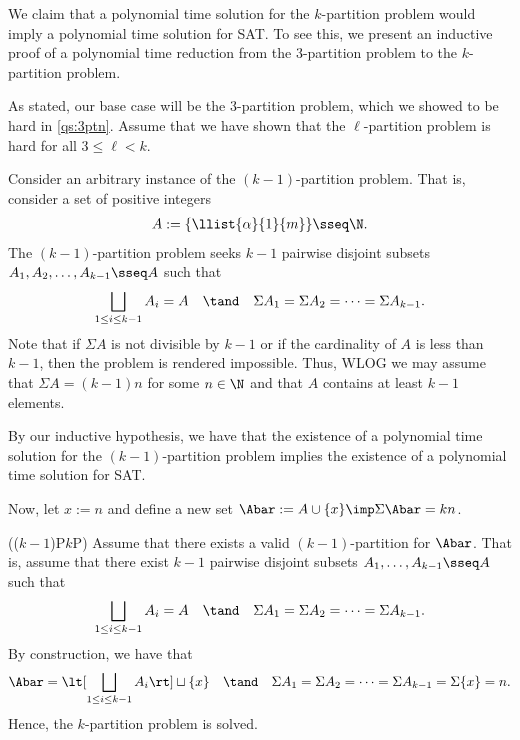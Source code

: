 \documentclass{article}
\begin{document}
\begin{solution}
  We claim that a polynomial time solution for the $ k $-partition problem would imply a polynomial time solution for SAT.
  To see this, we present an inductive proof of a polynomial time reduction from the 3-partition problem to the $ k $-partition problem.

  As stated, our base case will be the 3-partition problem, which we showed to be hard in \ref{qs:3ptn}.
  Assume that we have shown that the $ \ell $-partition problem is hard for all $ 3\leq\ell < k $.

  Consider an arbitrary instance of the $ (k-1) $-partition problem.
  That is, consider a set of positive integers \begin{align*}
    A := \{\llist{\alpha}{1}{m}\} \sseq \N.
  \end{align*}
  The $ (k-1) $-partition problem seeks $ k-1 $ pairwise disjoint subsets $ A_1,A_2,\ldots,A_{k-1}\sseq A $ such that \begin{align*}
    \bigsqcup_{1\leq i \leq k-1}A_{i} = A \quad \tand \quad \Sigma A_1 = \Sigma A_2 = \cdots = \Sigma A_{k-1}.
  \end{align*}
  Note that if $ \Sigma A $ is not divisible by $ k-1 $ or if the cardinality of $ A $ is less than $ k-1 $, then the problem is rendered impossible.
  Thus, WLOG we may assume that $ \Sigma A = (k-1)n $ for some $ n\in \N $ and that $ A $ contains at least $ k-1 $ elements.

  By our inductive hypothesis, we have that the existence of a polynomial time solution for the $ (k-1) $-partition problem implies the existence of a polynomial time solution for SAT.

  Now, let $ x := n $ and define a new set $ \Abar := A\cup \{x\}\imp \Sigma \Abar = kn $.

  \begin{subproof}[Correctness.]
    (($ k-1 $)P\imp $k$P)
    Assume that there exists a valid $ (k-1) $-partition for $ \Abar $.
    That is, assume that there exist $ k-1 $ pairwise disjoint subsets $ A_1,\ldots,A_{k-1}\sseq A $ such that \begin{align*}
      \bigsqcup_{1\leq i \leq k-1}A_{i} = A \quad \tand \quad \Sigma A_1 = \Sigma A_2 = \cdots = \Sigma A_{k-1}.
    \end{align*}
    By construction, we have that \begin{align*}
      \Abar = \lt[\bigsqcup_{1\leq i \leq k-1}A_{i}\rt] \sqcup \{x\} \quad \tand \quad \Sigma A_1 = \Sigma A_2 = \cdots = \Sigma A_{k-1} = \Sigma \{x\} = n.
    \end{align*}
    Hence, the $ k $-partition problem is solved.


\end{subproof}
\end{solution}
\end{document}
